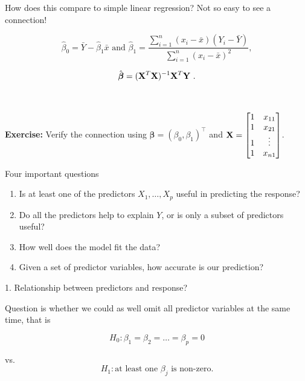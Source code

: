 \documentclass[
  10pt,
  ignorenonframetext,
]{beamer}
\begin{document}
\begin{frame}
How does this compare to simple linear regression? Not so easy to see a
connection!

\[\hat{\beta}_0 = \bar{Y}-\hat{\beta}_1 \bar{x} \text{ and } \hat{\beta}_1 = \frac{\sum_{i=1}^n(x_i-\bar{x})(Y_i-\bar{Y})}{\sum_{i=1}^n(x_i-\bar{x})^2},\]

\[ \hat{\boldsymbol\beta}=({\bf X}^T{\bf X})^{-1} {\bf X}^T {\bf Y} \ .\]

\(~\)

\textbf{Exercise:} Verify the connection using
\(\boldsymbol\beta=(\beta_0,\beta_1)^\top\) and
\({\bf X}= \left[\begin{matrix} 1 & x_{11} \\ 1 & x_{21} \\ 1 & \vdots \\ 1 & x_{n1} \\ \end{matrix}\right]\).
\end{frame}

\begin{frame}{Four important questions}
\protect\hypertarget{four-important-questions}{}
\begin{enumerate}
\item
  Is at least one of the predictors \(X_1, \ldots, X_p\) useful in
  predicting the response?
\item
  Do all the predictors help to explain \(Y\), or is only a subset of
  predictors useful?
\item
  How well does the model fit the data?
\item
  Given a set of predictor variables, how accurate is our prediction?
\end{enumerate}
\end{frame}

\begin{frame}
\begin{block}{1. Relationship between predictors and response?}
\protect\hypertarget{relationship-between-predictors-and-response}{}
\(~\)

Question is whether we could as well omit all predictor variables at the
same time, that is

\begin{center}
$$H_0: \beta_1=\beta_2=\ldots=\beta_p=0 $$

vs. 
$$H_1: \text{at least one } \beta_j \text{ is non-zero.}$$
\end{center}
\end{block}
\end{frame}
\end{document}
